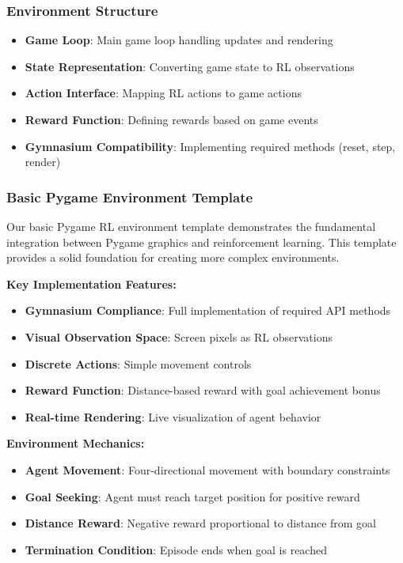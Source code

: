 \documentclass[12pt]{article}
\begin{document}
{{{\subsubsection{Environment Structure}

\begin{itemize}
    \item \textbf{Game Loop}: Main game loop handling updates and rendering
    \item \textbf{State Representation}: Converting game state to RL observations
    \item \textbf{Action Interface}: Mapping RL actions to game actions
    \item \textbf{Reward Function}: Defining rewards based on game events
    \item \textbf{Gymnasium Compatibility}: Implementing required methods (reset, step, render)
\end{itemize}

\subsubsection{Basic Pygame Environment Template}

Our basic Pygame RL environment template demonstrates the fundamental integration between Pygame graphics and reinforcement learning. This template provides a solid foundation for creating more complex environments.

\textbf{Key Implementation Features:}
\begin{itemize}
    \item \textbf{Gymnasium Compliance}: Full implementation of required API methods
    \item \textbf{Visual Observation Space}: Screen pixels as RL observations
    \item \textbf{Discrete Actions}: Simple movement controls
    \item \textbf{Reward Function}: Distance-based reward with goal achievement bonus
    \item \textbf{Real-time Rendering}: Live visualization of agent behavior
\end{itemize}

\textbf{Environment Mechanics:}
\begin{itemize}
    \item \textbf{Agent Movement}: Four-directional movement with boundary constraints
    \item \textbf{Goal Seeking}: Agent must reach target position for positive reward
    \item \textbf{Distance Reward}: Negative reward proportional to distance from goal
    \item \textbf{Termination Condition}: Episode ends when goal is reached
\end{itemize}

}}}
\end{document}
